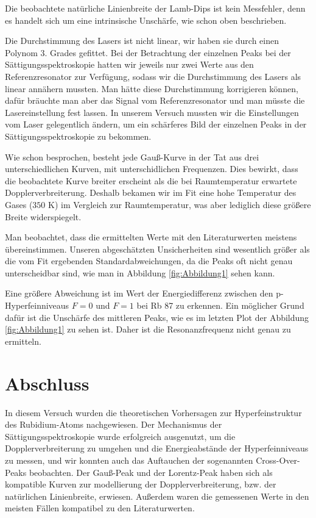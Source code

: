 \documentclass[a4paper,parskip]{scrartcl}
\begin{document}
Die beobachtete natürliche Linienbreite der Lamb-Dips ist kein Messfehler, denn es handelt sich um eine intrinsische Unschärfe, wie schon oben beschrieben.

Die Durchstimmung des Lasers ist nicht linear, wir haben sie durch einen Polynom 3. Grades gefittet. Bei der Betrachtung der einzelnen Peaks bei der Sättigungsspektroskopie hatten wir jeweils nur zwei Werte aus den Referenzresonator zur Verfügung, sodass wir die Durchstimmung des Lasers als linear annähern mussten. Man hätte diese Durchstimmung korrigieren können, dafür bräuchte man aber das Signal vom Referenzresonator und man müsste die Lasereinstellung fest lassen. In unserem Versuch mussten wir die Einstellungen vom Laser gelegentlich ändern, um ein schärferes Bild der einzelnen Peaks in der Sättigungsspektroskopie zu bekommen.

Wie schon besprochen, besteht jede Gauß-Kurve in der Tat aus drei unterschiedlichen Kurven, mit unterschidlichen Frequenzen. Dies bewirkt, dass die beobachtete Kurve breiter erscheint als die bei Raumtemperatur erwartete Dopplerverbreiterung. Deshalb bekamen wir im Fit eine hohe Temperatur des Gases ($350$ K) im Vergleich zur Raumtemperatur, was aber lediglich diese größere Breite widerspiegelt.

Man beobachtet, dass die ermittelten Werte mit den Literaturwerten meistens übereinstimmen. Unseren abgeschätzten Unsicherheiten sind wesentlich größer als die vom Fit ergebenden Standardabweichungen, da die Peaks oft nicht genau unterscheidbar sind, wie man in Abbildung \ref{fig:Abbildung1} sehen kann.

Eine größere Abweichung ist im Wert der Energiedifferenz zwischen den p-Hyperfeinniveaus $F=0$ und $F=1$ bei Rb 87 zu erkennen. Ein möglicher Grund dafür ist die Unschärfe des mittleren Peaks, wie es im letzten Plot der Abbildung \ref{fig:Abbildung1} zu sehen ist. Daher ist die Resonanzfrequenz nicht genau zu ermitteln.

\section{Abschluss}

In diesem Versuch wurden die theoretischen Vorhersagen zur Hyperfeinstruktur des Rubidium-Atoms nachgewiesen. Der Mechanismus der Sättigungsspektroskopie wurde erfolgreich ausgenutzt, um die Dopplerverbreiterung zu umgehen und die Energieabstände der Hyperfeinniveaus zu messen, und wir konnten auch das Auftauchen der sogenannten Cross-Over-Peaks beobachten. Der Gauß-Peak und der Lorentz-Peak haben sich als kompatible Kurven zur modellierung der Dopplerverbreiterung, bzw. der natürlichen Linienbreite, erwiesen. Außerdem waren die gemessenen Werte in den meisten Fällen kompatibel zu den Literaturwerten.

\newpage


\end{document}

